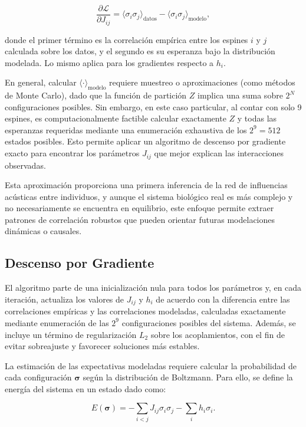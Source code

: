 \documentclass[a4paper,10pt,twocolumn]{article}
\begin{document}
\[
\frac{\partial \mathcal{L}}{\partial J_{ij}} = \langle \sigma_i \sigma_j \rangle_{\text{datos}} - \langle \sigma_i \sigma_j \rangle_{\text{modelo}},
\]

donde el primer término es la correlación empírica entre los 
espines \( i \) y \( j \) calculada sobre los datos, y el 
segundo es su esperanza bajo la distribución modelada. 
Lo mismo aplica para los gradientes respecto a \( h_i \).

En general, calcular 
\( \langle \cdot \rangle_{\text{modelo}} \) 
requiere muestreo o aproximaciones (como métodos de Monte Carlo), 
dado que la función de partición \( Z \) implica una suma 
sobre \( 2^N \) configuraciones posibles. Sin embargo, en 
este caso particular, al contar con solo 9 espines, es 
computacionalmente factible calcular exactamente \( Z \) y 
todas las esperanzas requeridas mediante una enumeración 
exhaustiva de los \( 2^9 = 512 \) estados posibles. Esto 
permite aplicar un algoritmo de descenso por gradiente exacto 
para encontrar los parámetros \( J_{ij} \) que mejor explican 
las interacciones observadas.

Esta aproximación proporciona una primera inferencia de la red 
de influencias acústicas entre individuos, y aunque el sistema 
biológico real es más complejo y no necesariamente se encuentra 
en equilibrio, este enfoque permite extraer patrones de 
correlación robustos que pueden orientar futuras modelaciones 
dinámicas o causales.

\subsection{Descenso por Gradiente}

El algoritmo parte de una inicialización nula para todos los 
parámetros y, en cada iteración, actualiza los valores de 
\( J_{ij} \) y \( h_i \) de acuerdo con la diferencia entre 
las correlaciones empíricas y las correlaciones modeladas, 
calculadas exactamente mediante enumeración de las 
\( 2^9 \) configuraciones posibles del sistema. 
Además, se incluye un término de regularización \( L_2 \) 
sobre los acoplamientos, con el fin de evitar sobreajuste 
y favorecer soluciones más estables.

La estimación de las expectativas modeladas requiere calcular 
la probabilidad de cada configuración \( \boldsymbol{\sigma} \) 
según la distribución de Boltzmann. Para ello, se define 
la energía del sistema en un estado dado como:

\[
E(\boldsymbol{\sigma}) = -\sum_{i<j} J_{ij} \sigma_i \sigma_j - \sum_i h_i \sigma_i.
\]
\end{document}
